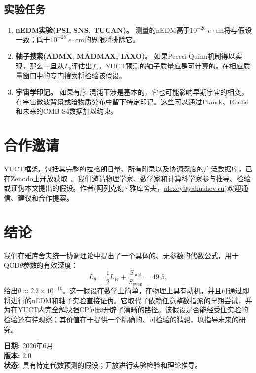 \documentclass[12pt,a4paper]{article}
\begin{document}
	\subsection{实验任务}
	\begin{enumerate}
		\item \textbf{nEDM实验(PSI, SNS, TUCAN)。}
		测量的nEDM高于\(10^{-26}\;e\!\cdot\!\mathrm{cm}\)将与假设一致；低于\(10^{-28}\;e\!\cdot\!\mathrm{cm}\)的界限将排除它。
		\item \textbf{轴子搜索(ADMX, MADMAX, IAXO)。}
		如果Peccei-Quinn机制得以实现，那么一旦从\(L_\theta\)评估出\(f_a\)，YUCT预测的轴子质量应是可计算的。在相应质量窗口中的专门搜索将检验该假设。
		\item \textbf{宇宙学印记。}
		如果有序-混沌干涉是基本的，它也可能影响早期宇宙的相变，在宇宙微波背景或暗物质分布中留下特定印记。这些可以通过Planck、Euclid和未来的CMB-S4数据加以约束。
	\end{enumerate}
	
	\section{合作邀请}
	\label{sec:invite}
	
	YUCT框架，包括其完整的拉格朗日量、所有附录以及协调深度的广泛数据库，已在Zenodo上开放获取~\cite{Y1,Y2}。我们邀请物理学家、数学家和计算科学家参与推导、检验或证伪本文提出的假设。作者(阿列克谢·雅库舍夫，\href{mailto:alexey@yakushev.eu}{alexey@yakushev.eu})欢迎通信、建议和合作提案。
	
	\section{结论}
	\label{sec:conclusion}
	
	我们在雅库舍夫统一协调理论中提出了一个具体的、无参数的代数公式，用于QCD\(\theta\)参数的有效深度：
	\[
	L_\theta = \frac{1}{2}L_W + \frac{S_{\mathrm{odd}}}{S_{\mathrm{even}}} = 49.5,
	\]
	给出\(\theta \approx 2.3 \times 10^{-10}\)。这一假设在数学上简单，在物理上具有动机，并且可通过即将进行的nEDM和轴子实验直接证伪。它取代了依赖任意整数指派的早期尝试，并为在YUCT内完全解决强CP问题开辟了清晰的路径。该假设是否能经受住实验的检验还有待观察；其价值在于提供一个精确的、可检验的猜想，以指导未来的研究。
	
	\vspace{1cm}
	\noindent\textbf{日期:} 2026年6月\\
	\textbf{版本:} 2.0\\
	\textbf{状态:} 具有特定代数预测的假设；开放进行实验检验和理论推导。
	
\end{document}
